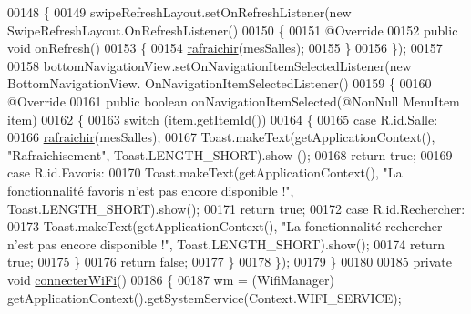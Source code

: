 \begin{DoxyCode}
00148     \{
00149         swipeRefreshLayout.setOnRefreshListener(\textcolor{keyword}{new} SwipeRefreshLayout.OnRefreshListener()
00150         \{
00151             @Override
00152             \textcolor{keyword}{public} \textcolor{keywordtype}{void} onRefresh()
00153             \{
00154                 \hyperlink{classcom_1_1lasalle_1_1meeting_1_1_main_activity_a58c77ea2af56877f661e85dcfd3f1299}{rafraichir}(mesSalles);
00155             \}
00156         \});
00157 
00158         bottomNavigationView.setOnNavigationItemSelectedListener(\textcolor{keyword}{new} BottomNavigationView.
      OnNavigationItemSelectedListener()
00159         \{
00160             @Override
00161             \textcolor{keyword}{public} \textcolor{keywordtype}{boolean} onNavigationItemSelected(@NonNull MenuItem item)
00162             \{
00163                 \textcolor{keywordflow}{switch} (item.getItemId())
00164                 \{
00165                     \textcolor{keywordflow}{case} R.id.Salle:
00166                         \hyperlink{classcom_1_1lasalle_1_1meeting_1_1_main_activity_a58c77ea2af56877f661e85dcfd3f1299}{rafraichir}(mesSalles);
00167                         Toast.makeText(getApplicationContext(), \textcolor{stringliteral}{"Rafraichisement"}, Toast.LENGTH\_SHORT).show
      ();
00168                         \textcolor{keywordflow}{return} \textcolor{keyword}{true};
00169                     \textcolor{keywordflow}{case} R.id.Favoris:
00170                         Toast.makeText(getApplicationContext(), \textcolor{stringliteral}{"La fonctionnalité favoris n'est pas encore
       disponible !"}, Toast.LENGTH\_SHORT).show();
00171                         \textcolor{keywordflow}{return} \textcolor{keyword}{true};
00172                     \textcolor{keywordflow}{case} R.id.Rechercher:
00173                         Toast.makeText(getApplicationContext(), \textcolor{stringliteral}{"La fonctionnalité rechercher n'est pas
       encore disponible !"}, Toast.LENGTH\_SHORT).show();
00174                         \textcolor{keywordflow}{return} \textcolor{keyword}{true};
00175                 \}
00176                 \textcolor{keywordflow}{return} \textcolor{keyword}{false};
00177             \}
00178         \});
00179     \}
00180 
\hyperlink{classcom_1_1lasalle_1_1meeting_1_1_main_activity_a8a28bbbc80b8806750b6297222f0bc92}{00185}     \textcolor{keyword}{private} \textcolor{keywordtype}{void} \hyperlink{classcom_1_1lasalle_1_1meeting_1_1_main_activity_a8a28bbbc80b8806750b6297222f0bc92}{connecterWiFi}()
00186     \{
00187         wm = (WifiManager) getApplicationContext().getSystemService(Context.WIFI\_SERVICE);

\end{DoxyCode}
